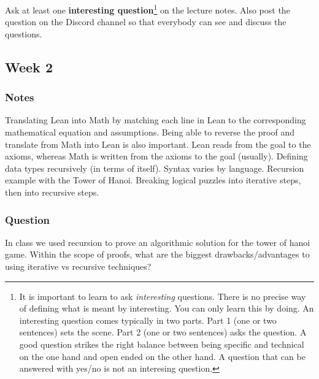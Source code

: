 \documentclass{article}
\theoremstyle{theorem}
\theoremstyle{definition}
\theoremstyle{remark}
\begin{document}


Ask at least one \textbf{interesting question}\footnote{It is important to learn to ask \emph{interesting} questions. There is no precise way of defining what is meant by interesting. You can only learn this by doing. An interesting question comes typically in two parts. Part 1 (one or two sentences) sets the scene. Part 2 (one or two sentences) asks the question. A good question strikes the right balance between being specific and technical on the one hand and open ended on the other hand. A question that can be answered with yes/no is not an interesing question.} on the lecture notes. Also post the question on the Discord channel so that everybody can see and discuss the questions.

\subsection{Week 2}

\subsubsection*{Notes}
Translating Lean into Math by matching each line in Lean to the corresponding mathematical equation and assumptions. Being able to reverse the proof and translate from Math into Lean is also important. Lean reads from the goal to the axioms, whereas Math is written from the axioms to the goal (usually).
\newline \newline Defining data types recursively (in terms of itself). Syntax varies by language. 
\newline \newline Recursion example with the Tower of Hanoi. Breaking logical puzzles into iterative steps, then into recursive steps.

\subsubsection*{Question}
In class we used recursion to prove an algorithmic solution for the tower of hanoi game. Within the scope of proofs, what are the biggest drawbacks/advantages to using iterative vs recursive techniques?
\end{document}
